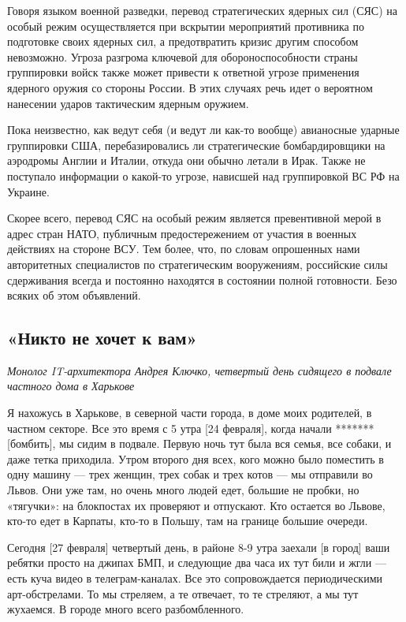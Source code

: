 Говоря языком военной разведки, перевод стратегических ядерных сил (СЯС) на особый режим осуществляется при вскрытии мероприятий противника по подготовке своих ядерных сил, а предотвратить кризис другим способом невозможно. Угроза разгрома ключевой для обороноспособности страны группировки войск также может привести к ответной угрозе применения ядерного оружия со стороны России. В этих случаях речь идет о вероятном нанесении ударов тактическим ядерным оружием.

Пока неизвестно, как ведут себя (и ведут ли как-то вообще) авианосные ударные группировки США, перебазировались ли стратегические бомбардировщики на аэродромы Англии и Италии, откуда они обычно летали в Ирак. Также не поступало информации о какой-то угрозе, нависшей над группировкой ВС РФ на Украине.

Скорее всего, перевод СЯС на особый режим является превентивной мерой в адрес стран НАТО, публичным предостережением от участия в военных действиях на стороне ВСУ. Тем более, что, по словам опрошенных нами авторитетных специалистов по стратегическим вооружениям, российские силы сдерживания всегда и постоянно находятся в состоянии полной готовности. Безо всяких об этом объявлений.

\subsection{«Никто не хочет к вам»}
\textit{Монолог IT-архитектора Андрея Ключко, четвертый день сидящего в подвале частного дома в Харькове}

Я нахожусь в Харькове, в северной части города, в доме моих родителей, в частном секторе. Все это время с 5 утра [24 февраля], когда начали ******* [бомбить], мы сидим в подвале. Первую ночь тут была вся семья, все собаки, и даже тетка приходила. Утром второго дня всех, кого можно было поместить в одну машину --- трех женщин, трех собак и трех котов --- мы отправили во Львов. Они уже там, но очень много людей едет, большие не пробки, но «тягучки»: на блокпостах их проверяют и отпускают. Кто остается во Львове, кто-то едет в Карпаты, кто-то в Польшу, там на границе большие очереди.

Сегодня [27 февраля] четвертый день, в районе 8-9 утра заехали [в город] ваши ребятки просто на джипах БМП, и следующие два часа их тут били и жгли --- есть куча видео в телеграм-каналах. Все это сопровождается периодическими арт-обстрелами. То мы стреляем, а те отвечает, то те стреляют, а мы тут жухаемся. В городе много всего разбомбленного.

